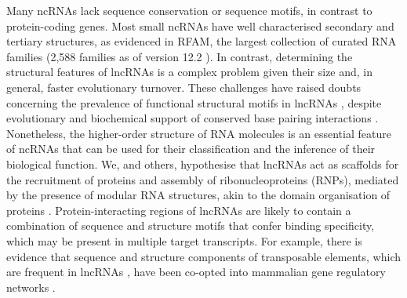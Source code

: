\documentclass{bmcart}
\begin{document}
Many ncRNAs lack sequence conservation or sequence motifs, in contrast to protein-coding genes.
Most small ncRNAs have well characterised secondary and tertiary structures, as
evidenced in RFAM, the largest collection of curated RNA families (2,588
families as of version 12.2 \cite{rfam12}). In contrast, determining the
structural features of lncRNAs is a complex problem given their size and, in
general, faster evolutionary turnover. These challenges have raised doubts
concerning the prevalence of functional structural  motifs in lncRNAs
\cite{eddy2014computational,rivas2016statistical}, despite evolutionary and
biochemical support of conserved base pairing interactions
\cite{smith2013widespread,spitale2015structural,lu2016rna}.
Nonetheless, the higher-order structure of RNA molecules is an essential feature of ncRNAs that can be used for their classification and the inference of their biological function. We, and others, hypothesise that
lncRNAs act as scaffolds for the recruitment of proteins and assembly of
ribonucleoproteins (RNPs), mediated by the presence of modular RNA structures,
akin to the domain organisation of proteins
\cite{zappulla2006rna,hogg2008structured,rinn2012genome,mercer2013structure,smith2013widespread,chujo2016architectural,blythe2016ins}.
Protein-interacting regions of lncRNAs are likely to contain a combination of
sequence and structure motifs that confer binding specificity, which may 
be present in multiple target transcripts. For example, there is evidence that 
sequence and structure components of transposable elements, 
which are frequent in lncRNAs \cite{kapusta2013transposable,hezroni2015principles}, 
have been co-opted into mammalian gene regulatory networks \cite{kunarso2010transposable,kelley2012transposable}. \\
\end{document}
